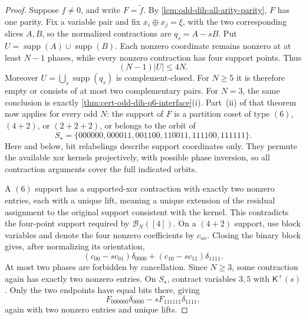 \documentclass[11pt,letterpaper,onecolumn]{article}
\theoremstyle{plain}
\theoremstyle{definition}
\theoremstyle{remark}
\newcommand{\supp}{\operatorname{supp}}
\begin{document}
	\begin{proof}
		Suppose \(f\ne0\), and write \(F=\widetilde f\).  By
		\cref{lem:odd-dih-all-arity-parity}, \(F\) has one parity.  Fix a variable pair
		and fix \(x_i\oplus x_j=\xi\), with the two corresponding slices \(A,B\), so the normalized contractions are \(q_s=A-sB\).  Put \(U=\supp(A)\cup\supp(B)\).
		Each nonzero coordinate remains nonzero at at least \(N-1\) phases, while every
		nonzero contraction has four support points.  Thus
		\[
		(N-1)|U|\le4N.
		\]
		Moreover \(U=\bigcup_s\supp(q_s)\) is complement-closed.  For \(N\ge5\)
		it is therefore empty or consists of at most two complementary pairs.  For
		\(N=3\), the same conclusion is exactly
		\cref{thm:cert-odd-dih-q6-interface}\textnormal{(i)}.  Part~\textnormal{(ii)}
		of that theorem now applies for every odd \(N\): the
		support of \(F\) is a partition coset of type \((6)\), \((4+2)\), or
		\((2+2+2)\), or belongs to the orbit of
		\begin{equation}
			S_\star=\{000000,000011,001100,110011,111100,111111\}.
			\label{eq:odd-dih-q6-nonproduct-support}
		\end{equation}
		Here and below, bit relabelings describe support coordinates only.  They
		permute the available xor kernels projectively, with possible phase
		inversion, so all contraction arguments cover the full indicated orbits.
		
		A \((6)\) support has a supported-xor contraction with exactly two
		nonzero entries, each with a unique lift, meaning a unique extension of the
		residual assignment to the original support consistent with the kernel.  This contradicts the four-point
		support required by \(\mathcal B_N([4])\).  On a \((4+2)\) support, use
		block variables and denote the four nonzero coefficients by \(c_{uv}\).
		Closing the binary block gives, after normalizing its orientation,
		\[
		(c_{00}-s c_{01})\delta_{0000}
		+(c_{10}-s c_{11})\delta_{1111}.
		\]
		At most two phases are forbidden by cancellation. Since \(N\ge3\), some
        contraction again has exactly two nonzero entries. On \(S_\star\), contract variables
		\(3,5\) with \(\mathsf K^+(s)\).  Only the two endpoints have equal bits
		there, giving
		\[
		F_{000000}\delta_{0000}-sF_{111111}\delta_{1111},
		\]
		again with two nonzero entries and unique lifts.
		

\end{proof}
\end{document}
